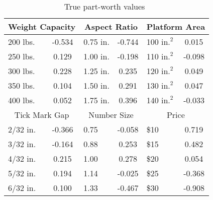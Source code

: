 \documentclass[onecolumn,11pt]{article}
\newcommand{\cutsubsectionup}{\vspace*{-0.09in}}
\newcommand{\cutsubsectionup}{}
\begin{document}
\begin{table}
\centering
\caption{True part-worth values~\cite{michalek2005linking}}
\label{tb:part-worth}
\begin{tabular}{ l c l c l c }
\hline
\multicolumn{2}{c}{Weight Capacity} & \multicolumn{2}{c}{Aspect Ratio} &
\multicolumn{2}{c}{Platform Area} \\
\hline
200 lbs. & -0.534 & 0.75 in. & -0.744 & 100 $\text{in.}^2$ & 0.015  \\
250 lbs. & 0.129 & 1.00 in. & -0.198 & 110 $\text{in.}^2$ & -0.098  \\
300 lbs. & 0.228 & 1.25 in. & 0.235 & 120 $\text{in.}^2$ & 0.049  \\
350 lbs. & 0.104 & 1.50 in. & 0.291 & 130 $\text{in.}^2$ & 0.047  \\
400 lbs. & 0.052 & 1.75 in. & 0.396 & 140 $\text{in.}^2$ & -0.033  \\
\hline
\multicolumn{2}{c}{Tick Mark Gap} & \multicolumn{2}{c}{Number Size} &
\multicolumn{2}{c}{Price}
\\
\hline
2/32 in. & -0.366 & 0.75 & -0.058 &  \$10 & 0.719 \\
3/32 in. & -0.164 & 0.88 & 0.253 &  \$15 & 0.482 \\
4/32 in. & 0.215 & 1.00 & 0.278 &  \$20 & 0.054 \\
5/32 in. & 0.194 & 1.14 & -0.025 &  \$25 & -0.368 \\
6/32 in. & 0.100 & 1.33 & -0.467 &  \$30 & -0.908 \\
\hline
\end{tabular}
\end{table}

\cutsubsectionup
\end{document}

